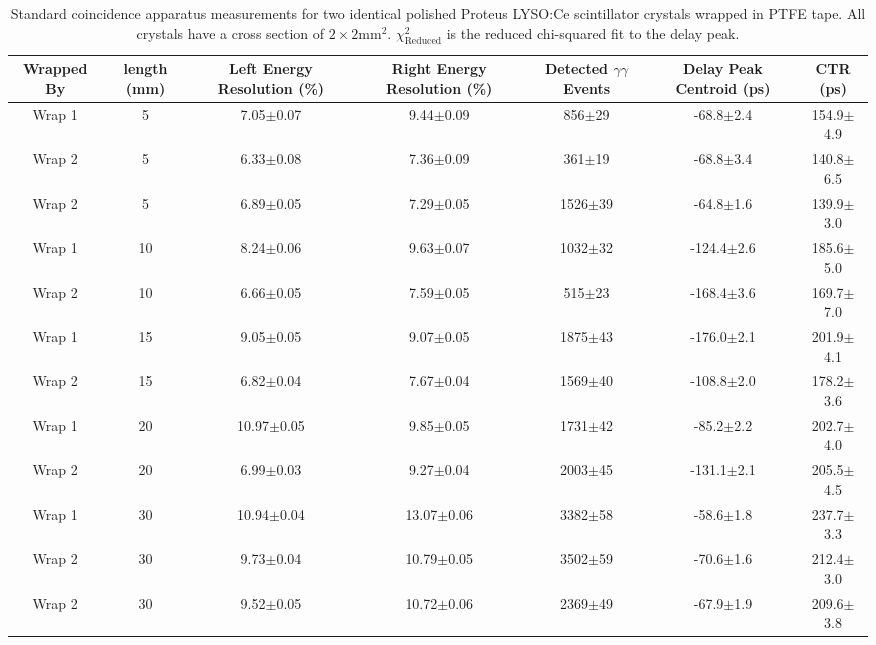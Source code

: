 \begin{table}
\caption{\label{tab:standardctr} Standard coincidence apparatus measurements for two identical polished Proteus LYSO:Ce scintillator crystals wrapped in PTFE tape. All crystals have a cross section of $2\times2$mm$^2$. $\chi^2_\text{Reduced}$ is the reduced chi-squared fit to the delay peak.}
\begin{tabular}{ccccccc}
\hline
Wrapped By &  length (mm) & Left Energy Resolution (\%) & Right Energy Resolution (\%) & Detected $\gamma\gamma$ Events & Delay Peak Centroid (ps) & CTR (ps)\\
\hline
Wrap 1 &      5 &   7.05$\pm$0.07 &   9.44$\pm$0.09 &   856$\pm$29 &   -68.8$\pm$2.4 &  154.9$\pm$4.9 \\
    Wrap 2 &      5 &   6.33$\pm$0.08 &   7.36$\pm$0.09 &   361$\pm$19 &   -68.8$\pm$3.4 &  140.8$\pm$6.5 \\
    Wrap 2 &      5 &   6.89$\pm$0.05 &   7.29$\pm$0.05 &  1526$\pm$39 &   -64.8$\pm$1.6 &  139.9$\pm$3.0 \\
    Wrap 1 &     10 &   8.24$\pm$0.06 &   9.63$\pm$0.07 &  1032$\pm$32 &  -124.4$\pm$2.6 &  185.6$\pm$5.0 \\
    Wrap 2 &     10 &   6.66$\pm$0.05 &   7.59$\pm$0.05 &   515$\pm$23 &  -168.4$\pm$3.6 &  169.7$\pm$7.0 \\
    Wrap 1 &     15 &   9.05$\pm$0.05 &   9.07$\pm$0.05 &  1875$\pm$43 &  -176.0$\pm$2.1 &  201.9$\pm$4.1 \\
    Wrap 2 &     15 &   6.82$\pm$0.04 &   7.67$\pm$0.04 &  1569$\pm$40 &  -108.8$\pm$2.0 &  178.2$\pm$3.6 \\
    Wrap 1 &     20 &  10.97$\pm$0.05 &   9.85$\pm$0.05 &  1731$\pm$42 &   -85.2$\pm$2.2 &  202.7$\pm$4.0 \\
    Wrap 2 &     20 &   6.99$\pm$0.03 &   9.27$\pm$0.04 &  2003$\pm$45 &  -131.1$\pm$2.1 &  205.5$\pm$4.5 \\
    Wrap 1 &     30 &  10.94$\pm$0.04 &  13.07$\pm$0.06 &  3382$\pm$58 &   -58.6$\pm$1.8 &  237.7$\pm$3.3 \\
    Wrap 2 &     30 &   9.73$\pm$0.04 &  10.79$\pm$0.05 &  3502$\pm$59 &   -70.6$\pm$1.6 &  212.4$\pm$3.0 \\
    Wrap 2 &     30 &   9.52$\pm$0.05 &  10.72$\pm$0.06 &  2369$\pm$49 &   -67.9$\pm$1.9 &  209.6$\pm$3.8 \\
\hline
\end{tabular}
\end{table}


